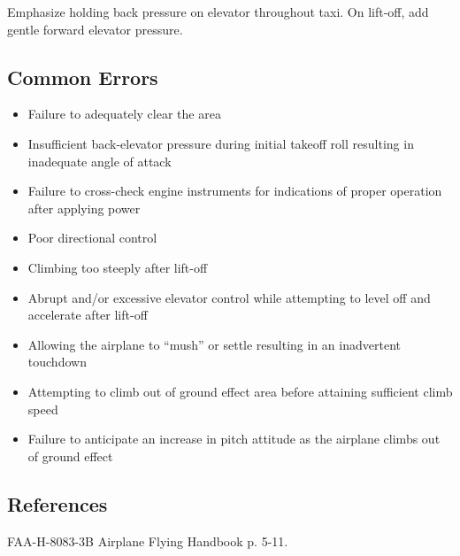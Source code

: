 Emphasize holding back pressure on elevator throughout taxi. On lift-off, add
gentle forward elevator pressure.

\subsection{Common Errors}

\begin{itemize}
  \item Failure to adequately clear the area
  \item Insufficient back-elevator pressure during initial takeoff roll
    resulting in inadequate angle of attack
  \item Failure to cross-check engine instruments for indications of proper
    operation after applying power
  \item Poor directional control
  \item Climbing too steeply after lift-off
  \item Abrupt and/or excessive elevator control while attempting to level off
    and accelerate after lift-off
  \item Allowing the airplane to ``mush'' or settle resulting in an inadvertent
    touchdown
  \item Attempting to climb out of ground effect area before attaining
    sufficient climb speed
  \item Failure to anticipate an increase in pitch attitude as the airplane
    climbs out of ground effect
\end{itemize}

\subsection{References}

FAA-H-8083-3B Airplane Flying Handbook p. 5-11.


